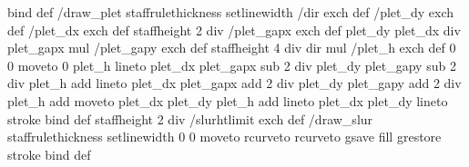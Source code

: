 {{{ } bind def
 /draw_plet
        {
                staffrulethickness setlinewidth
                /dir exch def
                /plet_dy exch def
                /plet_dx exch def
		staffheight 2 div /plet_gapx exch def
		plet_dy plet_dx div plet_gapx mul /plet_gapy exch def
		staffheight 4 div dir mul /plet_h exch def
%
		0 0 moveto
                0 plet_h lineto 
		plet_dx plet_gapx sub 2 div 
			plet_dy plet_gapy sub 2 div plet_h add lineto
		plet_dx plet_gapx add 2 div 
			plet_dy plet_gapy add 2 div plet_h add moveto
		plet_dx plet_dy plet_h add lineto
		plet_dx plet_dy lineto
		stroke
        }
        bind def
 staffheight 2 div /slurhtlimit exch def
/draw_slur
{
	staffrulethickness setlinewidth
	0 0 moveto
	rcurveto
	rcurveto
	gsave
	fill
	grestore
	stroke
	} bind def
}}

\def\turnOnExperimentalFeatures{%
\special{ps:
}}

